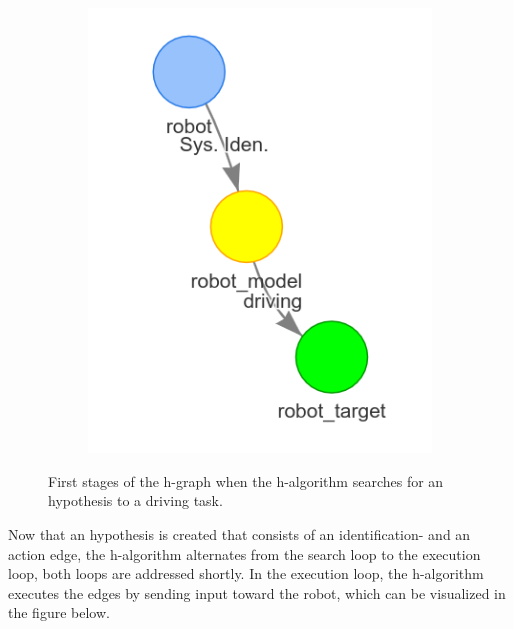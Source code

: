 \begin{figure}[h]
\begin{subfigure}{.3\textwidth}
    \end{subfigure}
    \begin{subfigure}{.3\textwidth}
    \centering
    \includegraphics[width=\textwidth]{figures/proposed_method/connecting_nodes/robot_to_target/robot_iden_drive_target}
    \end{subfigure}
    \caption{First stages of the \ac{h-graph} when the \ac{h-algorithm} searches for an hypothesis to a driving task.}%
    \label{fig:robot_drive_h-graph}
\end{figure}

Now that an hypothesis is created that consists of an identification- and an action edge, the \ac{h-algorithm} alternates from the search loop to the execution loop, both loops are addressed shortly. In the execution loop, the \ac{h-algorithm} executes the edges by sending input toward the robot, which can be visualized in the figure below.\bs

